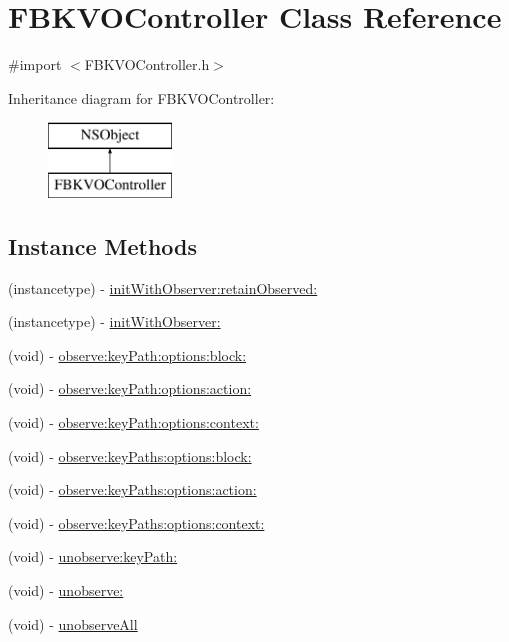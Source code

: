 \hypertarget{interface_f_b_k_v_o_controller}{\section{F\+B\+K\+V\+O\+Controller Class Reference}
\label{interface_f_b_k_v_o_controller}
}


{\ttfamily \#import $<$F\+B\+K\+V\+O\+Controller.\+h$>$}

Inheritance diagram for F\+B\+K\+V\+O\+Controller\+:\begin{figure}[H]
\begin{center}
\leavevmode
\includegraphics[height=2.000000cm]{interface_f_b_k_v_o_controller}
\end{center}
\end{figure}
\subsection*{Instance Methods}
\begin{DoxyCompactItemize}
\item 
(instancetype) -\/ \hyperlink{interface_f_b_k_v_o_controller_ab10c2daadcd69117b6dfddcdda0ca231}{init\+With\+Observer\+:retain\+Observed\+:}
\item 
(instancetype) -\/ \hyperlink{interface_f_b_k_v_o_controller_a0614e1c3de86e47a152cdf23aad5f85e}{init\+With\+Observer\+:}
\item 
(void) -\/ \hyperlink{interface_f_b_k_v_o_controller_a5dacda106c22565154f63248064410ed}{observe\+:key\+Path\+:options\+:block\+:}
\item 
(void) -\/ \hyperlink{interface_f_b_k_v_o_controller_accddd064c9d3a077150939d7196e3cc5}{observe\+:key\+Path\+:options\+:action\+:}
\item 
(void) -\/ \hyperlink{interface_f_b_k_v_o_controller_a0b6112256f04e33bd74d758b98c2b870}{observe\+:key\+Path\+:options\+:context\+:}
\item 
(void) -\/ \hyperlink{interface_f_b_k_v_o_controller_a548b9e1341e1817f275671bcd07b36a8}{observe\+:key\+Paths\+:options\+:block\+:}
\item 
(void) -\/ \hyperlink{interface_f_b_k_v_o_controller_af0fc7f0da260588c7a639efb0753a96d}{observe\+:key\+Paths\+:options\+:action\+:}
\item 
(void) -\/ \hyperlink{interface_f_b_k_v_o_controller_ad39efd9ce6078db4cd24a2338bb96472}{observe\+:key\+Paths\+:options\+:context\+:}
\item 
(void) -\/ \hyperlink{interface_f_b_k_v_o_controller_ac7362b1d5f39932948e4de66aba5cca9}{unobserve\+:key\+Path\+:}
\item 
(void) -\/ \hyperlink{interface_f_b_k_v_o_controller_ae614819487de82c3a513610031834a6d}{unobserve\+:}
\item 
(void) -\/ \hyperlink{interface_f_b_k_v_o_controller_a68986621c451e29b46b6b8eda62e188e}{unobserve\+All}
\end{DoxyCompactItemize}
